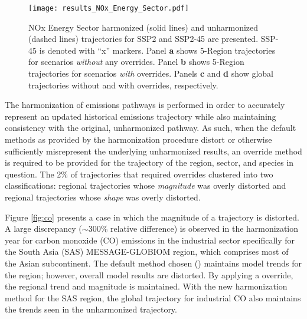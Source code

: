 \begin{figure}
  \begin{center}
    \texttt{[image: results\_NOx\_Energy\_Sector.pdf]}
    \caption[]{
      \label{fig:nox}
      NOx Energy Sector harmonized (solid lines) and unharmonized (dashed lines)
      trajectories for SSP2 and SSP2-45 are presented. SSP-45 is denoted with
      ``x'' markers. Panel \textbf{a} shows 5-Region trajectories for scenarios
      \textit{without} any overrides. Panel \textbf{b} shows 5-Region
      trajectories for scenarios \textit{with} overrides. Panels \textbf{c} and
      \textbf{d} show global trajectories without and with overrides,
      respectively.  }
  \end{center}
\end{figure}

The harmonization of emissions pathways is performed in order to accurately
represent an updated historical emissions trajectory while also maintaining
consistency with the original, unharmonized pathway. As such, when the default
methods as provided by the harmonization procedure distort or otherwise
sufficiently misrepresent the underlying unharmonized results, an override
method is required to be provided for the trajectory of the region, sector, and
species in question. The 2\% of trajectories that required
overrides clustered into two classifications: regional trajectories whose
\textit{magnitude} was overly distorted and regional trajectories whose
\textit{shape} was overly distorted.

Figure \ref{fig:co} presents a case in which the magnitude of a trajectory is
distorted. A large discrepancy ($\sim$300\% relative difference) is observed in
the harmonization year for carbon monoxide (CO) emissions in the industrial
sector specifically for the South Asia (SAS) MESSAGE-GLOBIOM region, which
comprises most of the Asian subcontinent. The default method chosen
() maintains model trends for the region; however, overall
model results are distorted. By applying a  override, the
regional trend and magnitude is maintained. With the new harmonization method
for the SAS region, the global trajectory for industrial CO also maintains the
trends seen in the unharmonized trajectory.
% 
% 

